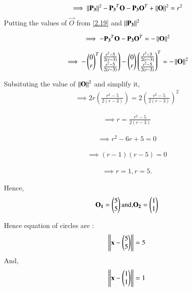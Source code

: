 \documentclass[journal,12pt,twocolumn]{IEEEtran}
\begin{document}
\begin{align}
 \implies \left\lVert\mathbf{P_3}\right\rVert^2 - \mathbf{P_3}^T\mathbf{O}  -  \mathbf{P_3} \mathbf{O}^T +\left\lVert\mathbf{O}\right\rVert^2 = r^2 \label{2.22.1}
\end{align}
Putting the values  of $\vec{O}$ from \ref{2.19} and $\left\lVert\mathbf{P_3}\right\rVert^2$

\begin{align}
\implies - \mathbf{P_3}^T\mathbf{O}  -  \mathbf{P_3} \mathbf{O}^T    = -  \left\lVert\mathbf{O}\right\rVert^2 \label{2.22.22}
\end{align}



\begin{align}
\implies - \begin{pmatrix}0 \\ r\end{pmatrix}^T\begin{pmatrix} \frac{r^2 - 5}{2 \left(r - 3\right)} \\ \frac{r^2 - 5}{2 \left(r - 3\right)} \\\end{pmatrix}  -  \begin{pmatrix}0 \\ r\end{pmatrix} \begin{pmatrix} \frac{r^2 - 5}{2 \left(r - 3\right)} \\ \frac{r^2 - 5}{2 \left(r - 3\right)} \\\end{pmatrix}^T    = -  \left\lVert\mathbf{O}\right\rVert^2 \label{2.22.2}
\end{align}

Subsituting the value of $\left\lVert\mathbf{O}\right\rVert^2$ and simplify it,
\begin{align}
\implies 2r \left( \frac{r^2 - 5}{2 \left(r - 3\right)} \right) = 2 \left( \frac{r^2 - 5}{2 \left(r - 3\right)} \right)^2 
\end{align}



\begin{align}
 \implies r  =  \frac{r^2 - 5}{2 \left(r - 3\right)} 
\end{align}


\begin{align}
\implies r^2 - 6r +5 = 0
\end{align}


\begin{align}
\implies \left( r -1\right) \left( r- 5\right) = 0
\end{align}

\begin{align}
\implies r = 1, r = 5.
\end{align}

Hence,
\begin{align}
\mathbf{O_1} = \begin{pmatrix}5 \\ 5 \\\end{pmatrix} \text{and,}  \mathbf{O_2} = \begin{pmatrix}1 \\ 1 \\\end{pmatrix}
\end{align}

Hence equation of circles are :
\begin{align}
\left\lVert\mathbf{x} - \begin{pmatrix}5 \\ 5 \\\end{pmatrix}\right\rVert = 5
\end{align}
And,
\begin{align}
\left\lVert\mathbf{x} - \begin{pmatrix}1 \\ 1 \\\end{pmatrix}\right\rVert = 1
\end{align}
\end{document}
